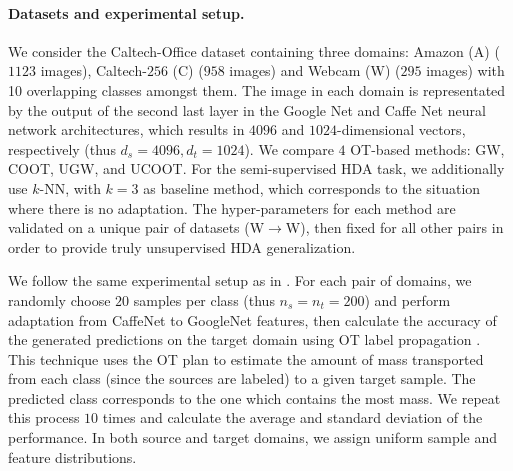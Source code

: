 \paragraph{Datasets and experimental setup.} We consider the Caltech-Office dataset \citep{Saenko10}
containing three domains:
Amazon (A) ($1123$ images), Caltech-$256$ (C) ($958$ images) and Webcam (W) ($295$ images)
with 10 overlapping classes amongst them. The image in each domain is representated by
the output of the second last layer
in the Google Net \citep{Szegedy15} and Caffe Net \citep{Jia14} neural network architectures,
which results in $4096$ and $1024$-dimensional vectors, respectively (thus $d_s = 4096, d_t = 1024$).
We compare $4$ OT-based methods: GW, COOT, UGW, and UCOOT. For the semi-supervised HDA task,
we additionally use $k$-NN, with $k=3$ as baseline method, which corresponds to the situation where
there is no adaptation. The hyper-parameters for each method are validated on a
unique pair of datasets (W$\rightarrow$W),
then fixed for all other pairs in order to provide truly unsupervised HDA generalization.

We follow the same experimental setup as in \citep{Redko20}. For each pair of domains,
we randomly choose $20$ samples per class (thus $n_s = n_t = 200$) and
perform adaptation from CaffeNet to GoogleNet features, then calculate the
accuracy of the generated predictions on the target domain using OT label propagation \citep{Redko19a}.
This technique uses the OT plan to estimate the amount of mass transported from each class
(since the sources are labeled) to a given target sample.
The predicted class corresponds to the one which contains the most mass.
We repeat this process $10$ times and calculate the average and standard deviation of the performance.
In both source and target domains, we assign uniform sample and feature distributions.

